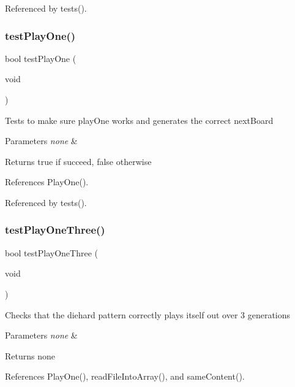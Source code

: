 Referenced by tests().

\mbox{\label{tests_8h_aa4c8095a20d90a18d843ab63ecd02d00}} 
\subsubsection{test\+Play\+One()}
{\footnotesize\ttfamily bool test\+Play\+One (\begin{DoxyParamCaption}\item[{void}]{ }\end{DoxyParamCaption})}

Tests to make sure play\+One works and generates the correct next\+Board 
\begin{DoxyParams}{Parameters}
{\em none} & \\
\hline
\end{DoxyParams}
\begin{DoxyReturn}{Returns}
true if succeed, false otherwise 
\end{DoxyReturn}


References Play\+One().



Referenced by tests().

\mbox{\label{tests_8h_a78144ff4e297fe99f33cc4da375dae89}} 
\subsubsection{test\+Play\+One\+Three()}
{\footnotesize\ttfamily bool test\+Play\+One\+Three (\begin{DoxyParamCaption}\item[{void}]{ }\end{DoxyParamCaption})}

Checks that the diehard pattern correctly plays itself out over 3 generations 
\begin{DoxyParams}{Parameters}
{\em none} & \\
\hline
\end{DoxyParams}
\begin{DoxyReturn}{Returns}
none 
\end{DoxyReturn}


References Play\+One(), read\+File\+Into\+Array(), and same\+Content().



